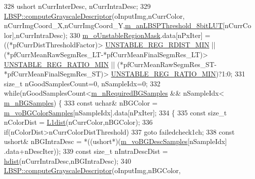 \begin{DoxyCode}
328             ushort nCurrInterDesc, nCurrIntraDesc;
329             \mbox{\hyperlink{class_l_b_s_p_a4a5f635868b6b81ba53df2692ee3dfd8}{LBSP::computeGrayscaleDescriptor}}(oInputImg,nCurrColor,
      nCurrImgCoord\_X,nCurrImgCoord\_Y,\mbox{\hyperlink{class_background_subtractor_l_b_s_p_aefe69d94f08b2c4ba73ad1d254ad9153}{m\_anLBSPThreshold\_8bitLUT}}[nCurrColor],nCurrIntraDesc);
330             \mbox{\hyperlink{class_background_subtractor_su_b_s_e_n_s_e_acfaf4c3c5aedbed8bd302444b4a4f8dd}{m\_oUnstableRegionMask}}.data[nPxIter] = ((*pfCurrDistThresholdFactor)>
      \mbox{\hyperlink{_background_subtractor_su_b_s_e_n_s_e_8cpp_a6168b44590b3d4a1fdcee44fe0755f39}{UNSTABLE\_REG\_RDIST\_MIN}} || (*pfCurrMeanRawSegmRes\_LT-*pfCurrMeanFinalSegmRes\_LT)>
      \mbox{\hyperlink{_background_subtractor_su_b_s_e_n_s_e_8cpp_acaad1bde74ca3c5a5c43c0e8deea2313}{UNSTABLE\_REG\_RATIO\_MIN}} || (*pfCurrMeanRawSegmRes\_ST-*pfCurrMeanFinalSegmRes\_ST)>
      \mbox{\hyperlink{_background_subtractor_su_b_s_e_n_s_e_8cpp_acaad1bde74ca3c5a5c43c0e8deea2313}{UNSTABLE\_REG\_RATIO\_MIN}})?1:0;
331             \textcolor{keywordtype}{size\_t} nGoodSamplesCount=0, nSampleIdx=0;
332             \textcolor{keywordflow}{while}(nGoodSamplesCount<\mbox{\hyperlink{class_background_subtractor_su_b_s_e_n_s_e_aca07c4307021623f9055832506cad1d6}{m\_nRequiredBGSamples}} && nSampleIdx<
      \mbox{\hyperlink{class_background_subtractor_su_b_s_e_n_s_e_ad783b71b5b942c4018d27cf38b7d7225}{m\_nBGSamples}}) \{
333                 \textcolor{keyword}{const} uchar& nBGColor = \mbox{\hyperlink{class_background_subtractor_su_b_s_e_n_s_e_a9d4d4bb930b34745536b9862683bb539}{m\_voBGColorSamples}}[nSampleIdx].data[nPxIter];
334                 \{
335                     \textcolor{keyword}{const} \textcolor{keywordtype}{size\_t} nColorDist = \mbox{\hyperlink{_distance_utils_8h_ab6ec458f6d3fb6fb4e6cda3808e61703}{L1dist}}(nCurrColor,nBGColor);
336                     \textcolor{keywordflow}{if}(nColorDist>nCurrColorDistThreshold)
337                         \textcolor{keywordflow}{goto} failedcheck1ch;
338                     \textcolor{keyword}{const} ushort& nBGIntraDesc = *((ushort*)(\mbox{\hyperlink{class_background_subtractor_su_b_s_e_n_s_e_a422cc2f2a25c07efca02087bd6fe3d6d}{m\_voBGDescSamples}}[nSampleIdx]
      .data+nDescIter));
339                     \textcolor{keyword}{const} \textcolor{keywordtype}{size\_t} nIntraDescDist = \mbox{\hyperlink{_distance_utils_8h_ab13812ef6e21af771d6c0a856cd941b0}{hdist}}(nCurrIntraDesc,nBGIntraDesc);
340                     \mbox{\hyperlink{class_l_b_s_p_a4a5f635868b6b81ba53df2692ee3dfd8}{LBSP::computeGrayscaleDescriptor}}(oInputImg,nBGColor,

\end{DoxyCode}
